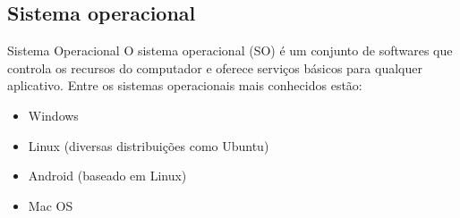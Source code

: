 \documentclass[portuguese,10pt,xcolor=table]{bredelebeamer}
\begin{document}
	\begin{frame}
	\end{frame}

\subsection{Sistema operacional}
	\begin{frame} 
		\begin{beamerboxesrounded}{Sistema Operacional}
		O sistema operacional (SO) é um conjunto de softwares que controla os recursos do computador e oferece serviços básicos para qualquer aplicativo. Entre os sistemas operacionais mais conhecidos estão:
		\begin{itemize}
			\item Windows
			\item Linux (diversas distribuições como Ubuntu)
			\item Android (baseado em Linux)
			\item Mac OS
		\end{itemize}
		\end{beamerboxesrounded}
	\end{frame}
\end{document}
